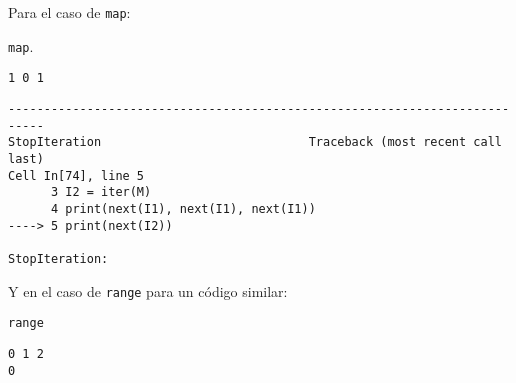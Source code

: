 Para el caso de \texttt{map}:
\begin{code} \texttt{map}.
\begin{Shaded}
\begin{Highlighting}[]
\OperatorTok{=} \NormalTok{(}\NormalTok{, (}\OperatorTok{{-}}\NormalTok{, }\NormalTok{, }\NormalTok{))}
\OperatorTok{=} 
\OperatorTok{=} 
\NormalTok{(}
\NormalTok{(}
\end{Highlighting}
\end{Shaded}

\begin{verbatim}
1 0 1
\end{verbatim}

\begin{verbatim}
---------------------------------------------------------------------------
StopIteration                             Traceback (most recent call last)
Cell In[74], line 5
      3 I2 = iter(M)
      4 print(next(I1), next(I1), next(I1))
----> 5 print(next(I2))

StopIteration: 
\end{verbatim}
\end{code}

Y en el caso de \texttt{range} para un código similar:

\begin{code} \texttt{range}
\begin{Shaded}
\begin{Highlighting}[]
\OperatorTok{=} \NormalTok{(}\NormalTok{)}
\OperatorTok{=} 
\OperatorTok{=} 
\NormalTok{(}
\NormalTok{(}
\end{Highlighting}
\end{Shaded}

\begin{verbatim}
0 1 2
0
\end{verbatim}
\end{code}

